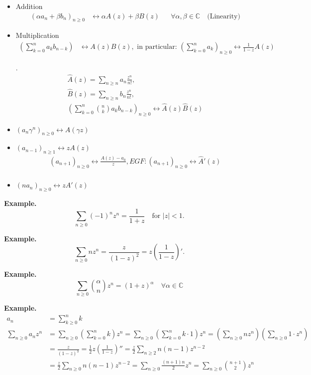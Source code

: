 \begin{itemize}
\item Addition
\begin{align*}
    (\alpha a_n + \beta b_n)_{n≥0}
        &\leftrightarrow \alpha A(z) + \beta B(z)
        &&\forall \alpha, \beta \in \mathbb{C}
        \quad\text{(Linearity)}
\end{align*}
\item Multiplication
\begin{align*}
    \left(\sum_{k=0}^{n} a_k b_{n-k} \right)
        &\leftrightarrow A(z) B(z),
        \text{ in particular: }
        \left(\sum_{k=0}^n a_k\right)_{n≥0} \leftrightarrow \frac{1}{1-z} A(z)
\end{align*}

\Remark.
\begin{align*}
    \hat{A}(z) = \sum_{n \geq n} a_n \frac{z^n}{n!}, \\
    \hat{B}(z) = \sum_{n \geq n} b_n \frac{z^n}{n!}, \\
    \left(\sum_{k=0}^n \binom{n}{ k} a_k b_{n-k}\right)_{n \geq 0}
        \leftrightarrow \hat A(z)\hat B(z)
\end{align*}

\item $
    (a_n \gamma^n)_{n≥0}
        ↔ A(\gamma z) $
\item $ (a_{n-1})_{n≥1}↔ z A(z)$
\begin{align*}
        (a_{n+1})_{n≥0} ↔ \frac{A(z)-a_0}z,
        EGF: (a_{n+1})_{n≥0} ↔ \hat A'(z) \\
\end{align*}
\item $(n a_n)_{n≥0}↔ z A'(z)$

\end{itemize}

\textbf{Example.}
\[
    \sum_{n≥0} (-1)^n z^n
    = \frac{1}{1+z} \quad\text{for $|z| < 1$}.
\]

\textbf{Example.}
\[
    \sum_{n≥0} n z^n
    = \frac{z}{(1-z)^2}
    = z \left(\frac1{1-z}\right)'.
\]

\textbf{Example.}
\[
    \sum_{n≥0} \binom{\alpha}{n} z^n
    = (1+z)^\alpha
    \quad\forall\alpha\in\mathbb{C}
\]

\textbf{Example.}
\begin{align*}
    a_n &= \sum_{k≥0}^n k\\
    \sum_{n≥0} a_n z^n
    &= \sum_{n≥0}
        \left(\sum_{k=0}^n k\right) z^n
    = \sum_{n≥0} \left(\sum_{k=0}^n  k\cdot 1\right) z^n
        = \left( \sum_{n≥0} n z^n \right) \left( \sum_{n≥0} 1 \cdot z^n \right)\\
    &= \frac{z}{(1-z)^3}
    = \frac12 z \left(\frac{1}{1-z}\right)''
    = \frac z2 \sum_{n≥2} n(n-1) z^{n-2}\\
    &= \frac z2 \sum_{n≥0} n(n-1) z^{n-2}
    = \sum_{n≥0} \frac{(n+1)n}{2} z^n
    = \sum_{n≥0} {\binom{n+1}{2}} z^n
\end{align*}

